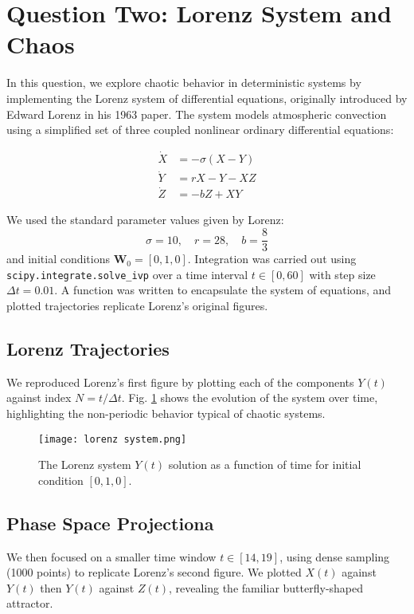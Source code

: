 \documentclass[10pt]{article}
\begin{document}
\section*{Question Two: Lorenz System and Chaos}

In this question, we explore chaotic behavior in deterministic systems by implementing the Lorenz system of differential equations, originally introduced by Edward Lorenz in his 1963 paper. The system models atmospheric convection using a simplified set of three coupled nonlinear ordinary differential equations:

\begin{align}
    \dot{X} &= -\sigma (X - Y) \\
    \dot{Y} &= rX - Y - XZ \\
    \dot{Z} &= -bZ + XY
\end{align}

We used the standard parameter values given by Lorenz:
\[
\sigma = 10, \quad r = 28, \quad b = \frac{8}{3}
\]
and initial conditions \( \mathbf{W}_0 = [0, 1, 0] \). Integration was carried out using \texttt{scipy.integrate.solve\_ivp} over a time interval \( t \in [0, 60] \) with step size \( \Delta t = 0.01 \). A function was written to encapsulate the system of equations, and plotted trajectories replicate Lorenz's original figures.

\subsection*{Lorenz Trajectories}
We reproduced Lorenz’s first figure by plotting each of the components \( Y(t) \) against index \( N = t / \Delta t \). Fig. \ref{fig:lorenz_traj} shows the evolution of the system over time, highlighting the non-periodic behavior typical of chaotic systems.

\begin{figure}[H]
    \centering
    \texttt{[image: lorenz system.png]}
    \caption{The Lorenz system  \( Y(t) \) solution as a function of time for initial condition \( [0, 1, 0] \). }
    \label{fig:lorenz_traj}
\end{figure}

\subsection*{Phase Space Projectiona}

We then focused on a smaller time window \( t \in [14, 19] \), using dense sampling (1000 points) to replicate Lorenz’s second figure. We plotted \( X(t) \) against \( Y(t) \) then \( Y(t) \) against \( Z(t) \), revealing the familiar butterfly-shaped attractor.
\end{document}
